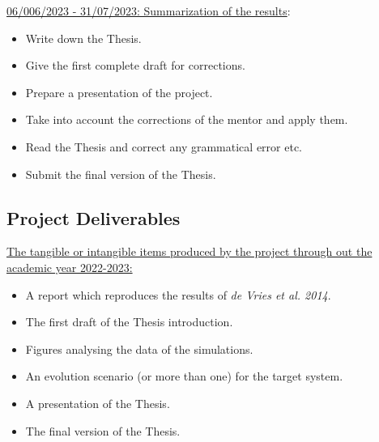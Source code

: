 \documentclass{uva-inf-article}
\numberwithin{equation}{section}
\begin{document}
\hspace*{-0.7cm}\underline{06/006/2023 - 31/07/2023: Summarization of the results}:
\begin{itemize}
    \item Write down the Thesis.
    \item Give the first complete draft for corrections.
    \item Prepare a presentation of the project.
    \item Take into account the corrections of the mentor and apply them.
    \item Read the Thesis and correct any grammatical error etc.
    \item Submit the final version of the Thesis.
\end{itemize}

\subsection{Project Deliverables}
\underline{The tangible or intangible items produced by the project through out the academic year 2022-2023:}\\
\vspace{0.1cm}
\begin{itemize}
    \item A report which reproduces the results of {\it de Vries et al. 2014}.
    \item The first draft of the Thesis introduction.
    \item Figures analysing the data of the simulations.
    \item An evolution scenario (or more than one) for the target system.
    \item A presentation of the Thesis.
    \item The final version of the Thesis.
\end{itemize}




\end{document}
